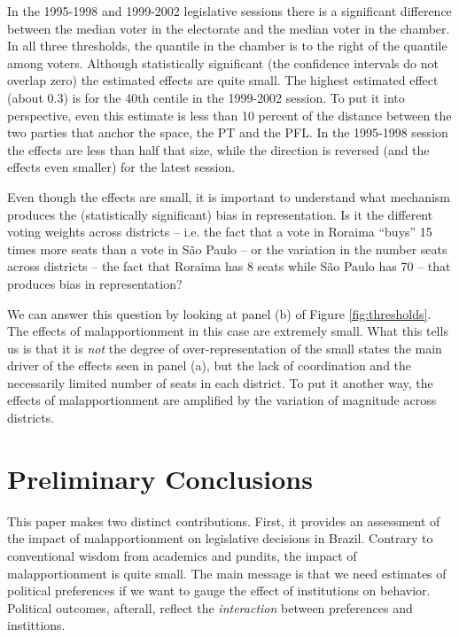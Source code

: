 In the 1995-1998 and 1999-2002 legislative sessions there is a significant difference between the median voter in the electorate and the median voter in the chamber. In all three thresholds, the quantile in the chamber is to the right of the quantile among voters. Although statistically significant (the confidence intervals do not overlap zero) the estimated effects are quite small. The highest estimated effect (about $0.3$) is for the  40th centile in the 1999-2002 session. To put it into perspective, even this estimate is less than 10 percent of the distance between the two parties that anchor the space, the PT and the PFL. In the 1995-1998 session the effects are less than half that size, while the direction is reversed (and the effects even smaller) for the latest session.

Even though the effects are small, it is important to understand what mechanism produces the (statistically significant) bias in representation. Is it the different voting weights across districts -- i.e. the fact that a vote in Roraima ``buys'' 15 times more seats than a vote in São Paulo -- or the variation in the number seats across districts -- the fact that Roraima has 8 seats while São Paulo has 70 -- that produces bias in representation?

We can answer this question by looking at panel (b) of Figure \ref{fig:thresholds}. The effects of malapportionment in this case are extremely small. What this tells us is that it is \emph{not} the degree of over-representation of the small states the main driver of the effects seen in panel (a), but the lack of coordination and the necessarily limited number of seats in each district. To put it another way, the effects of malapportionment are amplified by the variation of magnitude across districts\citep{monroe:2002}.

\section{Preliminary Conclusions}

This paper makes two distinct contributions. First, it provides an assessment of the impact of malapportionment on legislative decisions in Brazil. Contrary to conventional wisdom from academics and pundits, the impact of malapportionment is quite small. The main message is that we need  estimates of  political preferences if we want to gauge the effect of institutions on behavior. Political outcomes, afterall, reflect the \emph{interaction} between preferences and instittions. 

